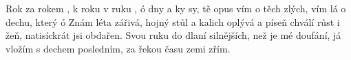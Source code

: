 \begin{TEXT}{Rok za rokem}
\REFREN  {}    , k roku  \NL
v ruku , ó      \NL
{} dny a ky  
\SLOKA {} sy,  tě  opus \NL
vím o těch  zlých, \NL
vím  lá \NL
{} o dechu, který  ó
\SLOKA Znám léta zářivá,\NL
hojný stůl a kalich oplývá\NL
a píseň chválí růst i žeň,\NL
natisíckrát jsi obdařen. 
\SLOKA Svou ruku do dlaní\NL
silnějších, než je mé doufání,\NL
já vložím s dechem posledním,\NL
za řekou času zemi zřím. \NL
\end{TEXT}
